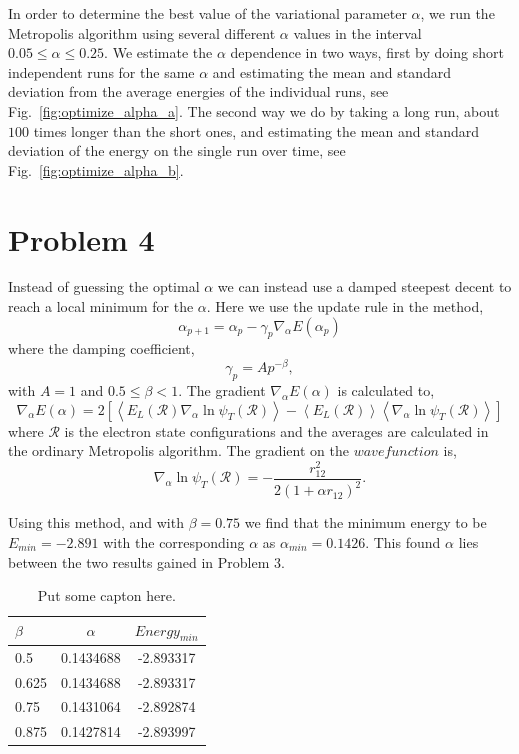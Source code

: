 In order to determine the best value of the variational parameter $\alpha$, we run the Metropolis algorithm using several different $\alpha$ values in the interval $0.05 \leq \alpha \leq 0.25$. We estimate the $\alpha$ dependence in two ways, first by doing short independent runs for the same $\alpha$ and estimating the mean and standard deviation from the average energies of the individual runs, see Fig.~\ref{fig:optimize_alpha_a}. The second way we do by taking a long run, about $100$ times longer than the short ones, and estimating the mean and standard deviation of the energy on the single run over time, see Fig.~\ref{fig:optimize_alpha_b}. 

\section*{Problem 4}

Instead of guessing the optimal $\alpha$ we can instead use a damped steepest decent to reach a local minimum for the $\alpha$. Here we use the update rule in the method,
\begin{equation}
\alpha_{p+1} = \alpha_p-\gamma_p \nabla_\alpha E(\alpha_p)
\end{equation} 
where the damping coefficient,
\begin{equation}
\gamma_p=Ap^{-\beta},
\end{equation}
with $A=1$ and $0.5\leq\beta < 1$. The gradient $\nabla_\alpha E(\alpha)$ is calculated to,
\begin{equation}
\nabla_\alpha E(\alpha) = 2\left[\left<E_L(\mathcal{R})\nabla_\alpha \ln{\psi_T(\mathcal{R})}\right>-\left<E_L(\mathcal{R})\right>\left<\nabla_\alpha\ln{\psi_T(\mathcal{R})}\right>\right]
\end{equation}
where $\mathcal{R}$ is the electron state configurations and the averages are calculated in the ordinary Metropolis algorithm. The gradient on the $wave function $ is,
\begin{equation}
\nabla_\alpha \ln{\psi_T(\mathcal{R})} = -\frac{r_{12}^2}{2(1+\alpha r_{12})^2}.
\end{equation}

Using this method, and with $\beta = 0.75$ we find that the minimum energy to be $E_{min}=-2.891$ with the corresponding $\alpha$ as $\alpha_{min}=0.1426$. This found $\alpha$ lies between the two results gained in Problem 3.

\begin{table}[H]
	\centering
	\caption{Put some capton here.}
	\begin{tabular}{|l|cc|}
		\hline $\beta$ & $\alpha$ & $Energy_{min}$ \\ \hline
		 0.5 & 0.1434688 & -2.893317 \\ \hline
		 0.625 & 0.1434688 & -2.893317 \\ \hline
		 0.75 & 0.1431064 & -2.892874 \\ \hline
		 0.875 & 0.1427814 & -2.893997 \\ \hline
	\end{tabular}
	\label{tab:prob5}
\end{table}



